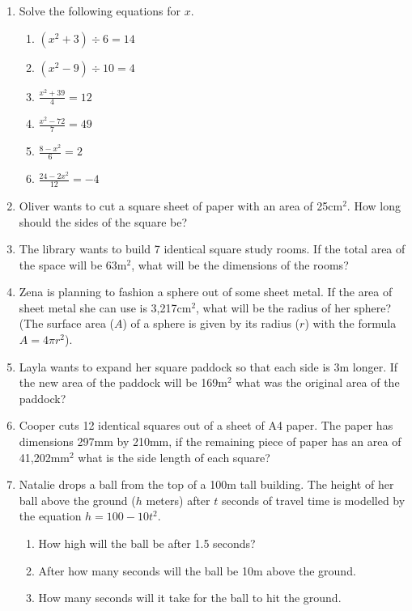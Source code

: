 \documentclass[a4paper,12pt]{article}
\begin{document}
\begin{enumerate}
\item Solve the following equations for $x$.
    \begin{multicols}{2}
    \begin{enumerate}
    \item $(x^2 + 3) \div 6 = 14$
    \item $(x^2 - 9) \div 10 = 4$
    \item $\displaystyle \frac{x^2 + 39}{4} = {12}$
    \item $\displaystyle \frac{x^2 - 72}{7} = {49}$
    \item $\displaystyle \frac{8 - x^2}{6} = {2}$
    \item $\displaystyle \frac{24 - 2x^2}{12} = {-4}$
    \end{enumerate}
    \end{multicols}

\item Oliver wants to cut a square sheet of paper with an 
area of 25cm$^2$. How long should the sides of the square be?

\item The library wants to build 7 identical square study rooms. 
If the total area of the space will be 63m$^2$, what will be 
the dimensions of the rooms?

\item Zena is planning to fashion a sphere out of some sheet
metal. If the area of sheet metal she can use is 3,217cm$^2$, 
what will be the radius of her sphere? (The surface area ($A$) of 
a sphere is given by its radius ($r$) with the 
formula $A = 4\pi r^2$).

\item Layla wants to expand her square paddock so that each 
side is 3m longer. If the new area of the paddock will be 169m$^2$ 
what was the original area of the paddock?

\item Cooper cuts 12 identical squares out of a sheet of A4 paper. 
The paper has dimensions 297mm by 210mm, if the remaining piece 
of paper has an area of 41,202mm$^2$ what is the side length of
each square?

\item Natalie drops a ball from the top of a 100m tall building. 
The height of her ball above the ground ($h$ meters) after $t$ 
seconds of travel time is modelled by the equation 
$h = 100 - 10t^2$.

\begin{enumerate}
    \item How high will the ball be after 1.5 seconds?
    \item After how many seconds will the ball be 10m above
    the ground.
    \item How many seconds will it take for the ball to hit the 
    ground.
\end{enumerate}


\end{enumerate}
\end{document}
